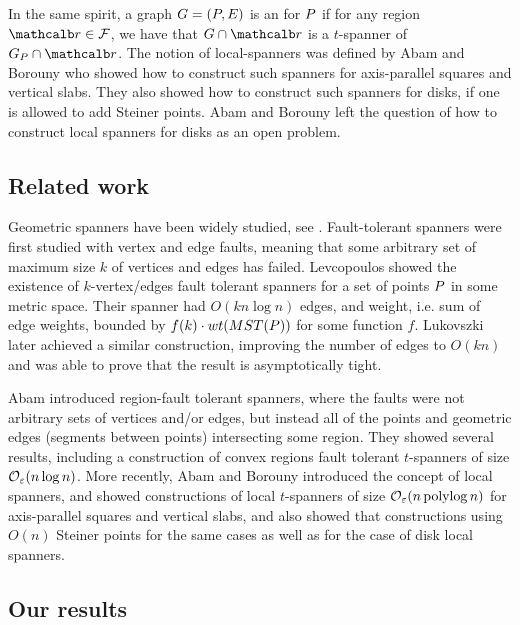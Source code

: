 \documentclass[12pt]{article}%
\begin{document}
In the same spirit, a graph $G=(P, E)$ is an  for $P$ if for any region $\region \in \FF$, we have
that $\restrictY{\G}{\region}$ is a $t$-spanner of
$\G_\PS \cap \region$.  The notion of local-spanners was defined by
Abam and Borouny \cite{ab-lgs-21} who showed how to construct such
spanners for axis-parallel squares and vertical slabs. They also
showed how to construct such spanners for disks, if one is allowed to
add Steiner points. Abam and Borouny left the question of how to
construct local spanners for disks as an open problem.

\subsection*{Related work}

Geometric spanners have been widely studied, see
\cite{ns-gsn-07}. Fault-tolerant spanners were first studied with
vertex and edge faults, meaning that some arbitrary set of maximum
size $k$ of vertices and edges has failed. Levcopoulos \etal
\cite{lns-iacfts-02} showed the existence of $k$-vertex/edges fault
tolerant spanners for a set of points $P$ in some metric
space. Their spanner had $O(kn\log n)$ edges, and weight, i.e. sum of
edge weights, bounded by $f(k)\cdot wt(MST(P))$ for some function
$f$. Lukovszki \cite{l-nrftgs-99} later achieved a similar
construction, improving the number of edges to $O(kn)$ and was able to
prove that the result is asymptotically tight.

Abam \etal\cite{abfg-rftgs-09} introduced region-fault tolerant
spanners, where the faults were not arbitrary sets of vertices and/or
edges, but instead all of the points and geometric edges (segments
between points) intersecting some region. They showed several results,
including a construction of convex regions fault tolerant $t$-spanners
of size $\mathcal{O}_\varepsilon(n\log n)$. More recently, Abam and Borouny
\cite{ab-lgs-21} introduced the concept of local spanners, and showed
constructions of local $t$-spanners of size $\mathcal{O}_\varepsilon(n \mathop{\mathrm{polylog}} n)$ for
axis-parallel squares and vertical slabs, and also showed that
constructions using $O(n)$ Steiner points for the same cases as well
as for the case of disk local spanners.

\subsection*{Our results}
\end{document}
